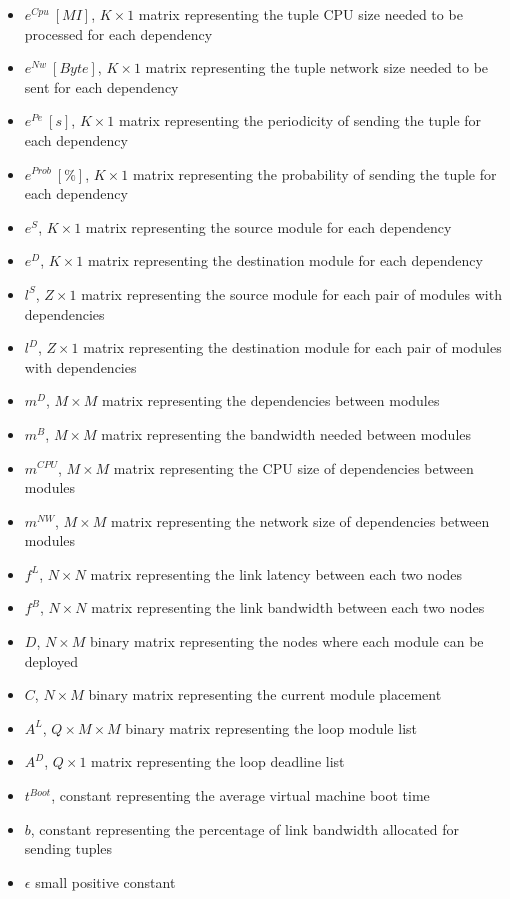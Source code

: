 \documentclass{article}
\begin{document}
\begin{itemize}
	\item $e^{Cpu}~[MI]$, $K\times 1$ matrix representing the tuple CPU size needed to be processed for each dependency
	\item $e^{Nw}~[Byte]$, $K\times 1$ matrix representing the tuple network size needed to be sent for each dependency
	\item $e^{Pe}~[s]$, $K\times 1$ matrix representing the periodicity of sending the tuple for each dependency
	\item $e^{Prob}~[\%]$, $K\times 1$ matrix representing the probability of sending the tuple for each dependency
	\item $e^{S}$, $K\times 1$ matrix representing the source module for each dependency
	\item $e^{D}$, $K\times 1$ matrix representing the destination module for each dependency\\
	
	\item $l^S$, $Z\times 1$ matrix representing the source module for each pair of modules with dependencies
	\item $l^D$, $Z\times 1$ matrix representing the destination module for each pair of modules with dependencies\\
	
	\item $m^D$, $M\times M$ matrix representing the dependencies between modules
	\item $m^B$, $M\times M$ matrix representing the bandwidth needed between modules
	\item $m^{CPU}$, $M\times M$ matrix representing the CPU size of dependencies between modules
	\item $m^{NW}$, $M\times M$ matrix representing the network size of dependencies between modules\\
	
	\item $f^L$, $N\times N$ matrix representing the link latency between each two nodes
	\item $f^B$, $N\times N$ matrix representing the link bandwidth between each two nodes\\
	
	\item $D$, $N\times M$ binary matrix representing the nodes where each module can be deployed
	\item $C$, $N\times M$ binary matrix representing the current module placement\\
	\pagebreak
	
	\item $A^L$, $Q\times M\times M$ binary matrix representing the loop module list
	\item $A^D$, $Q\times 1$ matrix representing the loop deadline list\\
	
	\item $t^{Boot}$, constant representing the average virtual machine boot time
	\item $b$, constant representing the percentage of link bandwidth allocated for sending tuples
	\item $\epsilon$ small positive constant
\end{itemize}
\end{document}
